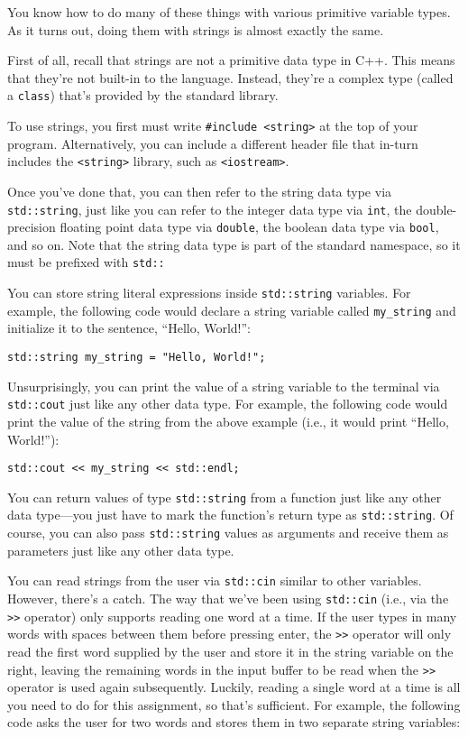 \documentclass{article}
\begin{document}
You know how to do many of these things with various primitive variable types. As it turns out, doing them with strings is almost exactly the same.

First of all, recall that strings are not a primitive data type in C++. This means that they're not built-in to the language. Instead, they're a complex type (called a \texttt{class}) that's provided by the standard library.

To use strings, you first must write \texttt{\#include <string>} at the top of your program. Alternatively, you can include a different header file that in-turn includes the \texttt{<string>} library, such as \texttt{<iostream>}.

Once you've done that, you can then refer to the string data type via \texttt{std::string}, just like you can refer to the integer data type via \texttt{int}, the double-precision floating point data type via \texttt{double}, the boolean data type via \texttt{bool}, and so on. Note that the string data type is part of the standard namespace, so it must be prefixed with \texttt{std::}

You can store string literal expressions inside \texttt{std::string} variables. For example, the following code would declare a string variable called \texttt{my\_string} and initialize it to the sentence, ``Hello, World!'':

\begin{verbatim}
std::string my_string = "Hello, World!";
\end{verbatim}

Unsurprisingly, you can print the value of a string variable to the terminal via \texttt{std::cout} just like any other data type. For example, the following code would print the value of the string from the above example (i.e., it would print ``Hello, World!''):

\begin{verbatim}
std::cout << my_string << std::endl;
\end{verbatim}

You can return values of type \texttt{std::string} from a function just like any other data type---you just have to mark the function's return type as \texttt{std::string}. Of course, you can also pass \texttt{std::string} values as arguments and receive them as parameters just like any other data type.

You can read strings from the user via \texttt{std::cin} similar to other variables. However, there's a catch. The way that we've been using \texttt{std::cin} (i.e., via the \texttt{>>} operator) only supports reading one word at a time. If the user types in many words with spaces between them before pressing enter, the \texttt{>>} operator will only read the first word supplied by the user and store it in the string variable on the right, leaving the remaining words in the input buffer to be read when the \texttt{>>} operator is used again subsequently. Luckily, reading a single word at a time is all you need to do for this assignment, so that's sufficient. For example, the following code asks the user for two words and stores them in two separate string variables:
\end{document}
